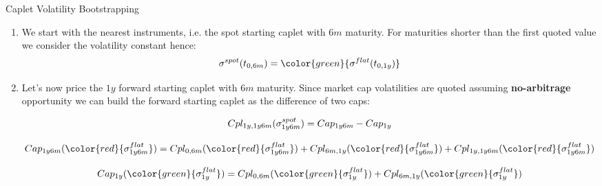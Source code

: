 \documentclass{beamer}
\begin{document}
\begin{frame}{Caplet Volatility Bootstrapping}
\begin{enumerate}
\item We start with the nearest instruments, i.e. the spot starting caplet with $6m$ maturity. For maturities shorter than the first quoted value we consider the volatility constant hence:
\begin{equation*}
\sigma^{spot}(t_{0,6m})=\color{green}{\sigma^{flat}(t_{0,1y})}
\end{equation*}

\item Let’s now price the $1y$ forward starting caplet with $6m$ maturity. Since market cap volatilities are quoted assuming \textbf{no-arbitrage} opportunity we can build the forward starting caplet as the difference of two caps:

\begin{equation*}
	\begin{gathered}
		Cpl_{1y, 1y6m}(\sigma^{spot}_{1y6m})=Cap_{1y6m}-Cap_{1y} \\[0.3cm]
		Cap_{1y6m}(\color{red}{\sigma^{flat}_{1y6m}})=Cpl_{0,6m}(\color{red}{\sigma^{flat}_{1y6m}}) + Cpl_{6m,1y}(\color{red}{\sigma^{flat}_{1y6m}}) + Cpl_{1y,1y6m}(\color{red}{\sigma^{flat}_{1y6m}}) \\[0.3cm]
		Cap_{1y}(\color{green}{\sigma^{flat}_{1y}})=Cpl_{0,6m}(\color{green}{\sigma^{flat}_{1y}}) + Cpl_{6m,1y}(\color{green}{\sigma^{flat}_{1y}})
	\end{gathered}
\end{equation*}
\end{enumerate}
\end{frame}
\end{document}
